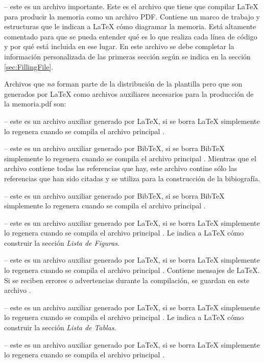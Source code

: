  -- este es un archivo importante. Este es el archivo que tiene que compilar \LaTeX{} para producir la memoria como un archivo PDF. Contiene un marco de trabajo y estructuras que le indican a \LaTeX{} cómo diagramar la memoria.  Está altamente comentado para que se pueda entender qué es lo que realiza cada línea de código y por qué está incluida en ese lugar.  En este archivo se debe completar la información personalizada de las primeras sección según se indica en la sección \ref{sec:FillingFile}.

Archivos que \emph{no} forman parte de la distribución de la plantilla pero que
son generados por \LaTeX{} como archivos auxiliares necesarios para la
producción de la memoria.pdf son:

 -- este es un archivo auxiliar generado por \LaTeX{}, si se borra \LaTeX{} simplemente lo regenera cuando se compila el archivo principal .

 -- este es un archivo auxiliar generado por BibTeX, si se borra BibTeX simplemente lo regenera cuando se compila el archivo principal . Mientras que el archivo  contiene todas las referencias que hay, este archivo  contine sólo las referencias que han sido citadas y se utiliza para la construcción de la bibiografía.

 -- este es un archivo auxiliar generado por BibTeX, si se borra BibTeX simplemente lo regenera cuando se compila el archivo principal .

 -- este es un archivo auxiliar generado por \LaTeX{}, si se borra \LaTeX{} simplemente lo regenera cuando se compila el archivo principal .  Le indica a \LaTeX{} cómo construir la sección \emph{Lista de Figuras}.

 --  este es un archivo auxiliar generado por \LaTeX{}, si se borra \LaTeX{} simplemente lo regenera cuando se compila el archivo principal . Contiene mensajes de \LaTeX{}. Si se reciben errores o advertencias durante la compilación, se guardan en este archivo .

 -- este es un archivo auxiliar generado por \LaTeX{}, si se borra \LaTeX{} simplemente lo regenera cuando se compila el archivo principal .  Le indica a \LaTeX{} cómo construir la sección \emph{Lista de Tablas}.

 -- este es un archivo auxiliar generado por \LaTeX{}, si se borra \LaTeX{} simplemente lo regenera cuando se compila el archivo principal .


